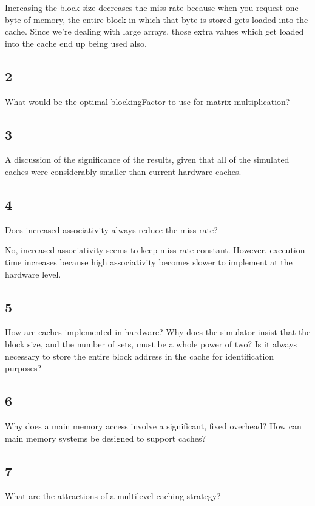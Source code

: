 \documentclass[letterpaper, 12pt, oneside]{memoir}
\begin{document}
Increasing the block size decreases the miss rate because when you request
one byte of memory, the entire block in which that byte is stored gets loaded
into the cache. Since we're dealing with large arrays, those extra values which
get loaded into the cache end up being used also.


\subsection{2}
What would be the optimal blockingFactor to use for matrix multiplication?


\subsection{3}
A discussion of the significance of the results, given that all of the simulated
caches were considerably smaller than current hardware caches.


\subsection{4}
Does increased associativity always reduce the miss rate?

No, increased associativity seems to keep miss rate constant. However, execution
time increases because high associativity becomes slower to implement at 
the hardware level.


\subsection{5}
How are caches implemented in hardware? Why does the simulator insist that the
block size, and the number of sets, must be a whole power of two? Is it always
necessary to store the entire block address in the cache for identification purposes?


\subsection{6}
Why does a main memory access involve a significant, fixed overhead? How can 
main memory systems be designed to support caches?


\subsection{7}
What are the attractions of a multilevel caching strategy?
\end{document}
